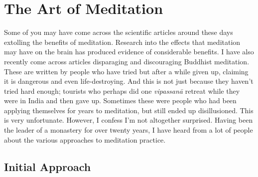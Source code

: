 

\chapter{The Art of Meditation}


Some of you may have come across the scientific articles around these
days extolling the benefits of meditation. Research into the effects
that meditation may have on the brain has produced evidence of
considerable benefits. I have also recently come across articles
disparaging and discouraging Buddhist meditation. These are written by
people who have tried but after a while given up, claiming it is
dangerous and even life-destroying. And this is not just because they
haven’t tried hard enough; tourists who perhaps did one \emph{vipassanā}
retreat while they were in India and then gave up. Sometimes these were
people who had been applying themselves for years to meditation, but
still ended up disillusioned. This is very unfortunate. However, I
confess I’m not altogether surprised. Having been the leader of a
monastery for over twenty years, I have heard from a lot of people about
the various approaches to meditation practice.

\section{Initial Approach}

